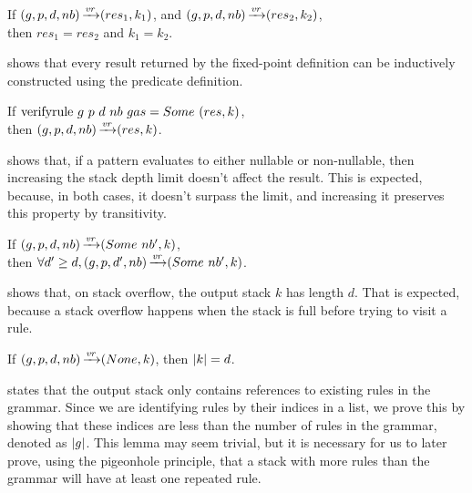 \begin{lemma}
    If $(g,p,d,nb) \operatorname{\xrightarrow{\mathit{vr}}} (res_1,k_1)$,
    and $(g,p,d,nb) \operatorname{\xrightarrow{\mathit{vr}}} (res_2,k_2)$, \\
    then $res_1 = res_2$ and $k_1 = k_2$.
    \label{lemma:vr-determinism}
\end{lemma}

 shows that
every result returned by the fixed-point definition
can be inductively constructed using the predicate definition.

\begin{lemma}
    If $\text{verifyrule}{}\ g\ p\ d\ nb\ gas = Some\ (res, k)$, \\
    then $(g,p,d,nb) \operatorname{\xrightarrow{\mathit{vr}}} (res,k)$.
    \label{lemma:vr-follows}
\end{lemma}

 shows that,
if a pattern evaluates to either nullable or non-nullable,
then increasing the stack depth limit
doesn't affect the result.
This is expected,
because, in both cases,
it doesn't surpass the limit,
and increasing it preserves this property
by transitivity.

\begin{lemma}%
    If $(g,p,d,nb) \operatorname{\xrightarrow{\mathit{vr}}} (Some\ nb',k)$, \\
    then $\forall d' \ge d, (g,p,d',nb) \operatorname{\xrightarrow{\mathit{vr}}} (Some\ nb',k)$.
    \label{lemma:stack-depth-convergence-not-lr-pattern}
\end{lemma}

 shows that,
on stack overflow,
the output stack $k$ has length $d$.
That is expected,
because a stack overflow happens
when the stack is full
before trying to visit a rule.

\begin{lemma}%
    If $(g,p,d,nb) \operatorname{\xrightarrow{\mathit{vr}}} (None,k)$,
    then $|k| = d$.
    \label{lemma:stack-depth-lr-pattern}
\end{lemma}

 states
that the output stack
only contains references to
existing rules in the grammar.
Since we are identifying rules
by their indices in a list,
we prove this by showing that these indices
are less than the number of rules in the grammar,
denoted as $|g|$.
This lemma may seem trivial,
but it is necessary for us to later prove,
using the pigeonhole principle,
that a stack with more rules than the grammar
will have at least one repeated rule.

